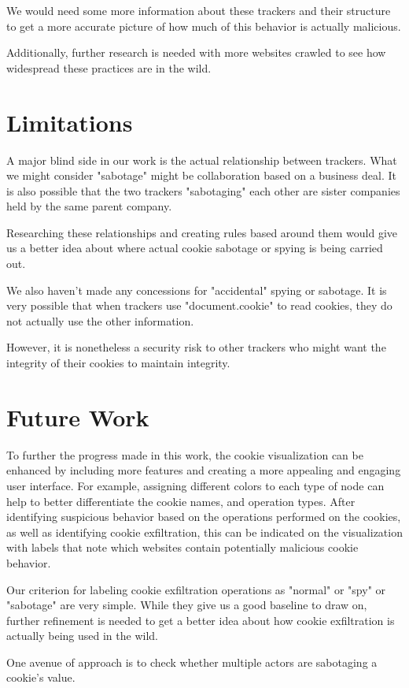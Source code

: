 \documentclass[sigplan,screen]{acmart}
\begin{document}
We would need some more information about these trackers and their structure to get a more accurate picture of how much of this behavior is actually malicious.

Additionally, further research is needed with more websites crawled to see how widespread these practices are in the wild.

\section{Limitations}
A major blind side in our work is the actual relationship between trackers. What we might consider "sabotage" might be collaboration based on a business deal. It is also possible that the two trackers "sabotaging" each other are sister companies held by the same parent company.

Researching these relationships and creating rules based around them would give us a better idea about where actual cookie sabotage or spying is being carried out.

We also haven't made any concessions for "accidental" spying or sabotage. 
It is very possible that when trackers use "document.cookie" to read cookies, they do not actually use the other information. 

However, it is nonetheless a security risk to other trackers who might want the integrity of their cookies to maintain integrity.

\section{Future Work}
To further the progress made in this work, the cookie visualization can be enhanced by including more features and creating a more appealing and engaging user interface. For example, assigning different colors to each type of node can help to better differentiate the cookie names, and operation types. After identifying suspicious behavior based on the operations performed on the cookies, as well as identifying cookie exfiltration, this can be indicated on the visualization with labels that note which websites contain potentially malicious cookie behavior. 

Our criterion for labeling cookie exfiltration operations as "normal" or "spy" or "sabotage" are very simple. While they give us a good baseline to draw on, further refinement is needed to get a better idea about how cookie exfiltration is actually being used in the wild.

One avenue of approach is to check whether multiple actors are sabotaging a cookie's value. 
\end{document}
